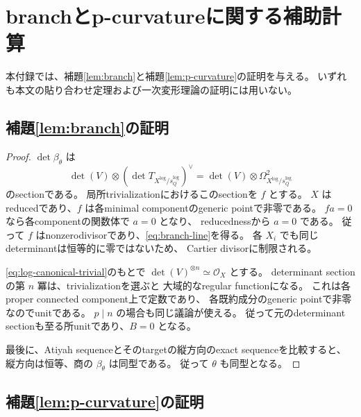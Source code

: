 \documentclass[uplatex,dvipdfmx,11pt]{jsarticle}
\numberwithin{equation}{section}
\theoremstyle{plain}
\theoremstyle{definition}
\theoremstyle{remark}
\newcommand{\OO}{\mathcal O}
\newcommand{\Tlog}{T_{X^{\log}/s_Q^{\log}}}
\begin{document}
\appendix

\section{branchとp-curvatureに関する補助計算}
\label{app:preliminary}

本付録では、補題\ref{lem:branch}と補題\ref{lem:p-curvature}の証明を与える。
いずれも本文の貼り合わせ定理および一次変形理論の証明には用いない。

\subsection*{補題\ref{lem:branch}の証明}

\begin{proof}
\(\det\beta_\theta\) は
\[
\det(V)\otimes(\det\Tlog)^\vee
=\det(V)\otimes\Omega^2_{X^{\log}/s_Q^{\log}}
\]
のsectionである。
局所trivializationにおけるこのsectionを \(f\) とする。
\(X\) はreducedであり、\(f\) は各minimal componentのgeneric pointで非零である。
\(fa=0\) なら各componentの関数体で \(a=0\) となり、
reducednessから \(a=0\) である。
従って \(f\) はnonzerodivisorであり、\eqref{eq:branch-line}を得る。
各 \(X_i\) でも同じdeterminantは恒等的に零ではないため、
Cartier divisorに制限される。

\eqref{eq:log-canonical-trivial}のもとで
\(\det(V)^{\otimes n}\simeq\OO_X\) とする。
determinant sectionの第 \(n\) 冪は、trivializationを選ぶと
大域的なregular functionになる。
これは各proper connected component上で定数であり、
各既約成分のgeneric pointで非零なのでunitである。
\(p\mid n\) の場合も同じ議論が使える。
従って元のdeterminant sectionも至る所unitであり、\(B=0\) となる。

最後に、Atiyah sequenceとそのtargetの縦方向のexact sequenceを比較すると、
縦方向は恒等、商の \(\beta_\theta\) は同型である。
従って \(\theta\) も同型となる。
\end{proof}

\subsection*{補題\ref{lem:p-curvature}の証明}
\end{document}
